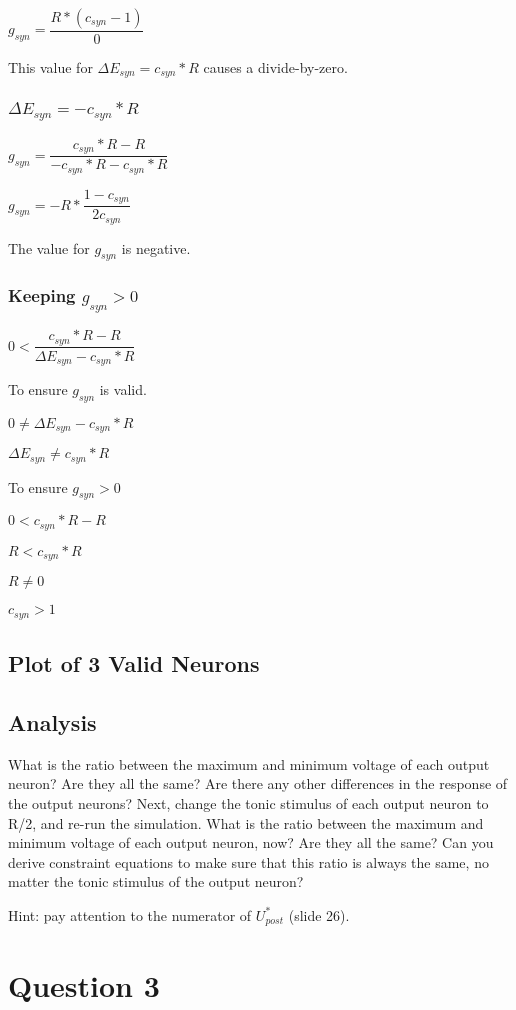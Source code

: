 \documentclass[12pt, letterpaper, oneside, notitlepage, onecolumn]{article}
\begin{document}
$g_{syn} = \dfrac{R * (c_{syn} - 1)}{0}$

This value for $\Delta E_{syn} = c_{syn} * R$ causes a divide-by-zero.

\subsubsection{$\Delta E_{syn} = -c_{syn} * R$}

$g_{syn} = \dfrac{c_{syn} * R - R}{-c_{syn} * R - c_{syn} * R}$

$g_{syn} = -R * \dfrac{1 - c_{syn}}{2 c_{syn}}$

The value for $g_{syn}$ is negative.

\subsubsection{Keeping $g_{syn} > 0$}

$0 < \dfrac{c_{syn} * R - R}{\Delta E_{syn} - c_{syn} * R}$

To ensure $g_{syn}$ is valid.

$0 \neq \Delta E_{syn} - c_{syn} * R$

$\Delta E_{syn} \neq c_{syn} * R$

To ensure $g_{syn} > 0$

$0 < c_{syn} * R - R$

$R < c_{syn} * R$

$R \neq 0$

$c_{syn} > 1$


\subsection{Plot of 3 Valid Neurons}


\subsection{Analysis}

What is the ratio between the maximum and minimum voltage of each output
neuron? Are they all the same? Are there any other differences in the response
of the output neurons? Next, change the tonic stimulus of each output neuron 
to R/2, and re-run the simulation. What is the ratio between the maximum and 
minimum voltage of each output neuron, now? Are they all the same? Can you 
derive constraint equations to make sure that this ratio is always the
same, no matter the tonic stimulus of the output neuron?

Hint: pay attention to the numerator of $U^{*}_{post}$ (slide 26).


\section{Question 3}
\end{document}
